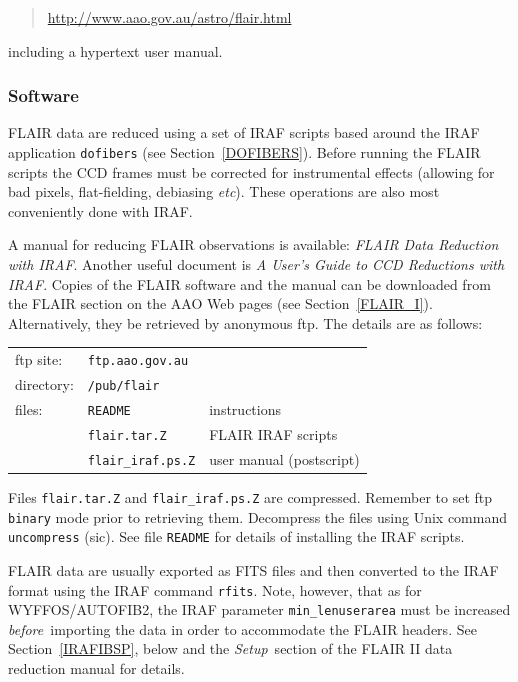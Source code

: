 \documentclass[chapters,twoside,11pt]{starlink}
\begin{document}
\begin{quote}
\url{http://www.aao.gov.au/astro/flair.html}
\end{quote}

including a hypertext user manual.

\subsubsection{\label{FLAIR_S}Software}

FLAIR data are reduced using a set of IRAF scripts based
around the IRAF application \texttt{dofibers} (see Section~\ref{DOFIBERS}).
Before running the FLAIR scripts the CCD frames must be corrected for
instrumental effects (allowing for bad pixels, flat-fielding, debiasing
\emph{etc}).  These operations are also most conveniently done with IRAF.

A manual for reducing FLAIR observations is available: \textit{FLAIR Data
Reduction with IRAF}\/\cite{DRINK96}.  Another useful document is \textit{A
User's Guide to CCD Reductions with IRAF}\/\cite{MASSEY92}.  Copies of the
FLAIR software and the manual can be downloaded from the FLAIR section on
the AAO Web pages (see Section~\ref{FLAIR_I}).  Alternatively, they be
retrieved by anonymous ftp.  The details are as follows:

\begin{tabular}{lll}
ftp site:  & \texttt{ftp.aao.gov.au}   & \\
directory: & \texttt{/pub/flair}       & \\
files:     & \texttt{README}           & instructions             \\
           & \texttt{flair.tar.Z}      & FLAIR IRAF scripts       \\
           & \texttt{flair\_iraf.ps.Z} & user manual (postscript) \\
\end{tabular}

Files \texttt{flair.tar.Z} and \texttt{flair\_iraf.ps.Z} are compressed.
Remember to set ftp \texttt{binary} mode prior to retrieving them.
Decompress the files using Unix command \texttt{uncompress} (sic).  See
file \texttt{README} for details of installing the IRAF scripts.

FLAIR data are usually exported as FITS files and then converted to
the IRAF format using the IRAF command \texttt{rfits}.  Note, however,
that as for WYFFOS/AUTOFIB2, the IRAF parameter \texttt{min\_lenuserarea}
must be increased \textit{before}\, importing the data in order to
accommodate the FLAIR headers.  See Section~\ref{IRAFIBSP}, below and the
\textit{Setup}\, section of the FLAIR II data reduction manual for details.
\end{document}
